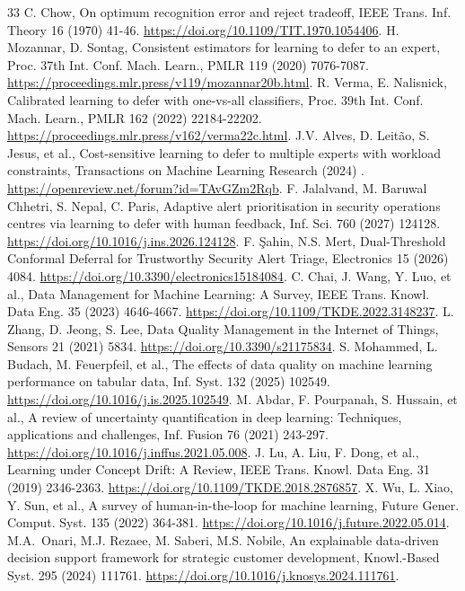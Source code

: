 \documentclass[11pt,letterpaper]{article}
\begin{document}
\begin{thebibliography}{33}
C. Chow, On optimum recognition error and reject tradeoff, IEEE Trans. Inf. Theory 16 (1970) 41-46. \url{https://doi.org/10.1109/TIT.1970.1054406}.
H. Mozannar, D. Sontag, Consistent estimators for learning to defer to an expert, Proc. 37th Int. Conf. Mach. Learn., PMLR 119 (2020) 7076-7087. \url{https://proceedings.mlr.press/v119/mozannar20b.html}.
R. Verma, E. Nalisnick, Calibrated learning to defer with one-vs-all classifiers, Proc. 39th Int. Conf. Mach. Learn., PMLR 162 (2022) 22184-22202. \url{https://proceedings.mlr.press/v162/verma22c.html}.
J.V. Alves, D. Leitão, S. Jesus, et al., Cost-sensitive learning to defer to multiple experts with workload constraints, Transactions on Machine Learning Research (2024) . \url{https://openreview.net/forum?id=TAvGZm2Rqb}.
F. Jalalvand, M. Baruwal Chhetri, S. Nepal, C. Paris, Adaptive alert prioritisation in security operations centres via learning to defer with human feedback, Inf. Sci. 760 (2027) 124128. \url{https://doi.org/10.1016/j.ins.2026.124128}.
F. Şahin, N.S. Mert, Dual-Threshold Conformal Deferral for Trustworthy Security Alert Triage, Electronics 15 (2026) 4084. \url{https://doi.org/10.3390/electronics15184084}.
C. Chai, J. Wang, Y. Luo, et al., Data Management for Machine Learning: A Survey, IEEE Trans. Knowl. Data Eng. 35 (2023) 4646-4667. \url{https://doi.org/10.1109/TKDE.2022.3148237}.
L. Zhang, D. Jeong, S. Lee, Data Quality Management in the Internet of Things, Sensors 21 (2021) 5834. \url{https://doi.org/10.3390/s21175834}.
S. Mohammed, L. Budach, M. Feuerpfeil, et al., The effects of data quality on machine learning performance on tabular data, Inf. Syst. 132 (2025) 102549. \url{https://doi.org/10.1016/j.is.2025.102549}.
M. Abdar, F. Pourpanah, S. Hussain, et al., A review of uncertainty quantification in deep learning: Techniques, applications and challenges, Inf. Fusion 76 (2021) 243-297. \url{https://doi.org/10.1016/j.inffus.2021.05.008}.
J. Lu, A. Liu, F. Dong, et al., Learning under Concept Drift: A Review, IEEE Trans. Knowl. Data Eng. 31 (2019) 2346-2363. \url{https://doi.org/10.1109/TKDE.2018.2876857}.
X. Wu, L. Xiao, Y. Sun, et al., A survey of human-in-the-loop for machine learning, Future Gener. Comput. Syst. 135 (2022) 364-381. \url{https://doi.org/10.1016/j.future.2022.05.014}.
M.A.~Onari, M.J. Rezaee, M. Saberi, M.S. Nobile, An explainable data-driven decision support framework for strategic customer development, Knowl.-Based Syst. 295 (2024) 111761. \url{https://doi.org/10.1016/j.knosys.2024.111761}.

\end{thebibliography}
\end{document}
